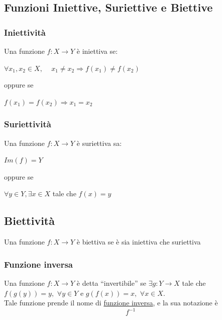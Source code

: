 \documentclass{article}
\theoremstyle{definition}
\newcommand{\virgolette}[1]{``#1''}
\begin{document}
\subsection{Funzioni Iniettive, Suriettive e Biettive}
\subsubsection{Iniettività}
Una funzione $f: X \rightarrow Y$ è iniettiva se:
\begin{center}
$\forall x_1,x_2 \in X, \,\,\,\,\,\,\, x_1\neq x_2 \Longrightarrow f(x_1) \neq f(x_2)$
\end{center}
oppure se
\begin{center}
    $f(x_1)=f(x_2) \Longrightarrow x_1=x_2$
\end{center}

\subsubsection{Suriettività}
Una funzione $f: X \rightarrow Y$ è suriettiva sa:
\begin{center}
    $Im(f)=Y$
\end{center}
oppure se 
\begin{center}
    $\forall y \in Y, \exists x \in X$ tale che $f(x)=y$
\end{center}
\subsection{Biettività}
Una funzione $f: X \rightarrow Y$ è biettiva se è sia iniettiva che suriettiva
\subsubsection{Funzione inversa}
Una funzione $f: X \rightarrow Y$ è detta \virgolette{invertibile} se $\exists g : Y \rightarrow X$ tale che $f(g(y))=y, \,\, \forall y\in Y$ e $g(f(x))=x, \,\, \forall x \in X$.
\\ Tale funzione prende il nome di \underline{funzione inversa}, e la sua notazione è
\begin{equation}
    f^{-1}
\end{equation}
\end{document}
